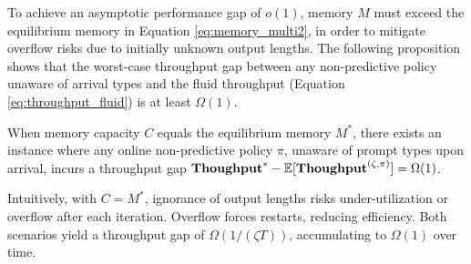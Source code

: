 To achieve an asymptotic performance gap of \( o(1) \), memory \( M \) must exceed the equilibrium memory in Equation \eqref{eq:memory_multi2}, in order to mitigate overflow risks due to initially unknown output lengths. The following proposition shows that the worst-case throughput gap between any non-predictive policy unaware of arrival types and the fluid throughput (Equation \eqref{eq:throughput_fluid}) is at least \( \Omega(1) \).

\begin{proposition}
\label{prop:unknown_lower_bound}
When memory capacity \( C \) equals the equilibrium memory \( M^* \), there exists an instance where any online non-predictive policy \( \pi \), unaware of prompt types upon arrival, incurs a throughput gap \( \textbf{Thoughput}^* - \mathbb{E}[\textbf{Thoughput}^{(\zeta, \pi)}] = \Omega(1) \).
\end{proposition}

Intuitively, with \( C = M^* \), ignorance of output lengths risks under-utilization or overflow after each iteration. Overflow forces restarts, reducing efficiency. Both scenarios yield a throughput gap of \( \Omega(1 / (\zeta T)) \), accumulating to \( \Omega(1) \) over time. 



